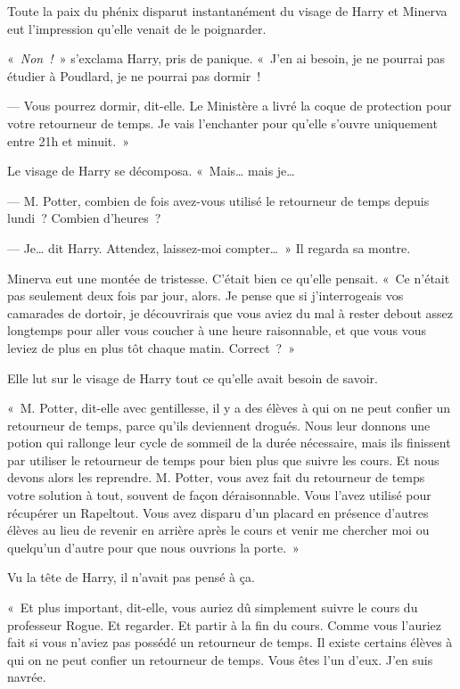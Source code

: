 Toute la paix du phénix disparut instantanément du visage de Harry et Minerva eut l'impression qu'elle venait de le poignarder.

«~\emph{Non~!}~» s'exclama Harry, pris de panique.
«~J'en ai besoin, je ne pourrai pas étudier à Poudlard, je ne pourrai pas dormir~!

--- Vous pourrez dormir, dit-elle.
Le Ministère a livré la coque de protection pour votre retourneur de temps.
Je vais l'enchanter pour qu'elle s'ouvre uniquement entre 21h et minuit.~»

Le visage de Harry se décomposa.
«~Mais… mais je…

--- M. Potter, combien de fois avez-vous utilisé le retourneur de temps depuis lundi~?
Combien d'heures~?

--- Je… dit Harry.
Attendez, laissez-moi compter…~»
Il regarda sa montre.

Minerva eut une montée de tristesse.
C'était bien ce qu'elle pensait.
«~Ce n'était pas seulement deux fois par jour, alors.
Je pense que si j'interrogeais vos camarades de dortoir, je découvrirais que vous aviez du mal à rester debout assez longtemps pour aller vous coucher à une heure raisonnable, et que vous vous leviez de plus en plus tôt chaque matin.
Correct~?~»

Elle lut sur le visage de Harry tout ce qu'elle avait besoin de savoir.

«~M. Potter, dit-elle avec gentillesse, il y a des élèves à qui on ne peut confier un retourneur de temps, parce qu'ils deviennent drogués.
Nous leur donnons une potion qui rallonge leur cycle de sommeil de la durée nécessaire, mais ils finissent par utiliser le retourneur de temps pour bien plus que suivre les cours.
Et nous devons alors les reprendre.
M. Potter, vous avez fait du retourneur de temps votre solution à tout, souvent de façon déraisonnable.
Vous l'avez utilisé pour récupérer un Rapeltout.
Vous avez disparu d'un placard en présence d'autres élèves au lieu de revenir en arrière après le cours et venir me chercher moi ou quelqu'un d'autre pour que nous ouvrions la porte.~»

Vu la tête de Harry, il n'avait pas pensé à ça.

«~Et plus important, dit-elle, vous auriez dû simplement suivre le cours du professeur Rogue.
Et regarder.
Et partir à la fin du cours.
Comme vous l'auriez fait si vous n'aviez pas possédé un retourneur de temps.
Il existe certains élèves à qui on ne peut confier un retourneur de temps.
Vous êtes l'un d'eux.
J'en suis navrée.

